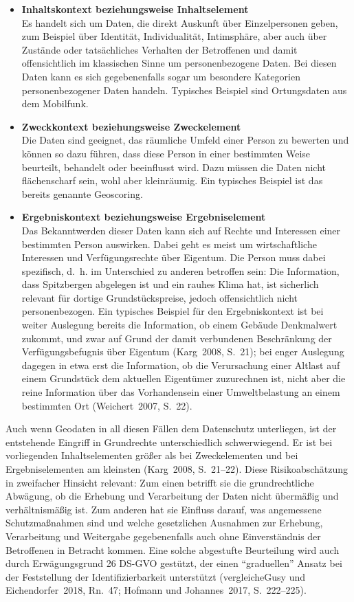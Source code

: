 \documentclass[a4paper,
fontsize=11pt,
oneside,
numbers=noperiodatend,
parskip=half-,
bibliography=totoc,
final
]{scrartcl}
\begin{document}
\begin{itemize}
\item
  \textbf{Inhaltskontext beziehungsweise Inhaltselement}\\
  Es handelt sich um Daten, die direkt Auskunft über Einzelpersonen
  geben, zum Beispiel über Identität, Individualität, Intimsphäre, aber
  auch über Zustände oder tatsächliches Verhalten der Betroffenen und
  damit offensichtlich im klassischen Sinne um personenbezogene Daten.
  Bei diesen Daten kann es sich gegebenenfalls sogar um besondere
  Kategorien personenbezogener Daten handeln. Typisches Beispiel sind
  Ortungsdaten aus dem Mobilfunk.
\item
  \textbf{Zweckkontext beziehungsweise Zweckelement}\\
  Die Daten sind geeignet, das räumliche Umfeld einer Person zu bewerten
  und können so dazu führen, dass diese Person in einer bestimmten Weise
  beurteilt, behandelt oder beeinflusst wird. Dazu müssen die Daten
  nicht flächenscharf sein, wohl aber kleinräumig. Ein typisches
  Beispiel ist das bereits genannte Geoscoring.
\item
  \textbf{Ergebniskontext beziehungsweise Ergebniselement}\\
  Das Bekanntwerden dieser Daten kann sich auf Rechte und Interessen
  einer bestimmten Person auswirken. Dabei geht es meist um
  wirtschaftliche Interessen und Verfügungsrechte über Eigentum. Die
  Person muss dabei spezifisch, d.~h. im Unterschied zu anderen
  betroffen sein: Die Information, dass Spitzbergen abgelegen ist und
  ein rauhes Klima hat, ist sicherlich relevant für dortige
  Grundstückspreise, jedoch offensichtlich nicht personenbezogen. Ein
  typisches Beispiel für den Ergebniskontext ist bei weiter Auslegung
  bereits die Information, ob einem Gebäude Denkmalwert zukommt, und
  zwar auf Grund der damit verbundenen Beschränkung der
  Verfügungsbefugnis über Eigentum (Karg~2008, S.~21); bei enger
  Auslegung dagegen in etwa erst die Information, ob die Verursachung
  einer Altlast auf einem Grundstück dem aktuellen Eigentümer
  zuzurechnen ist, nicht aber die reine Information über das
  Vorhandensein einer Umweltbelastung an einem bestimmten Ort
  (Weichert~2007, S.~22).
\end{itemize}

Auch wenn Geodaten in all diesen Fällen dem Datenschutz unterliegen, ist
der entstehende Eingriff in Grundrechte unterschiedlich schwerwiegend.
Er ist bei vorliegenden Inhaltselementen größer als bei Zweckelementen
und bei Ergebniselementen am kleinsten (Karg~2008, S.~21--22). Diese
Risikoabschätzung in zweifacher Hinsicht relevant: Zum einen betrifft
sie die grundrechtliche Abwägung, ob die Erhebung und Verarbeitung der
Daten nicht übermäßig und verhältnismäßig ist. Zum anderen hat sie
Einfluss darauf, was angemessene Schutzmaßnahmen sind und welche
gesetzlichen Ausnahmen zur Erhebung, Verarbeitung und Weitergabe
gegebenenfalls auch ohne Einverständnis der Betroffenen in Betracht
kommen. Eine solche abgestufte Beurteilung wird auch durch
Erwägungsgrund 26 DS-GVO gestützt, der einen \enquote{graduellen} Ansatz
bei der Feststellung der Identifizierbarkeit unterstützt (vergleicheGusy
und Eichendorfer~2018, Rn.~47; Hofmann und Johannes~2017, S.~222--225).
\end{document}

